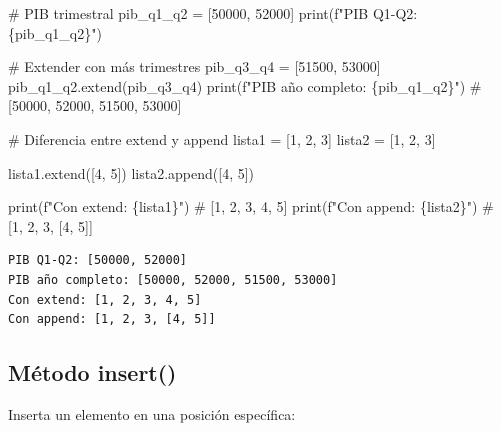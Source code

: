 \documentclass[
  doc,
  floatsintext,
  longtable,
  a4paper,
  nolmodern,
  notxfonts,
  notimes,
  12pt,
  colorlinks=true,linkcolor=blue,citecolor=blue,urlcolor=blue]{apa7}
\newenvironment{Shaded}{\begin{snugshade}}{\end{snugshade}}
\newcommand{\BuiltInTok}[1]{\textcolor[rgb]{0.00,0.23,0.31}{#1}}
\newcommand{\CommentTok}[1]{\textcolor[rgb]{0.37,0.37,0.37}{#1}}
\newcommand{\DecValTok}[1]{\textcolor[rgb]{0.68,0.00,0.00}{#1}}
\newcommand{\NormalTok}[1]{\textcolor[rgb]{0.00,0.23,0.31}{#1}}
\newcommand{\OperatorTok}[1]{\textcolor[rgb]{0.37,0.37,0.37}{#1}}
\newcommand{\SpecialCharTok}[1]{\textcolor[rgb]{0.37,0.37,0.37}{#1}}
\newcommand{\SpecialStringTok}[1]{\textcolor[rgb]{0.13,0.47,0.30}{#1}}
\begin{document}
\begin{Shaded}
\begin{Highlighting}[]
\CommentTok{\# PIB trimestral}
\NormalTok{pib\_q1\_q2 }\OperatorTok{=}\NormalTok{ [}\DecValTok{50000}\NormalTok{, }\DecValTok{52000}\NormalTok{]}
\BuiltInTok{print}\NormalTok{(}\SpecialStringTok{f"PIB Q1{-}Q2: }\SpecialCharTok{\{}\NormalTok{pib\_q1\_q2}\SpecialCharTok{\}}\SpecialStringTok{"}\NormalTok{)}

\CommentTok{\# Extender con más trimestres}
\NormalTok{pib\_q3\_q4 }\OperatorTok{=}\NormalTok{ [}\DecValTok{51500}\NormalTok{, }\DecValTok{53000}\NormalTok{]}
\NormalTok{pib\_q1\_q2.extend(pib\_q3\_q4)}
\BuiltInTok{print}\NormalTok{(}\SpecialStringTok{f"PIB año completo: }\SpecialCharTok{\{}\NormalTok{pib\_q1\_q2}\SpecialCharTok{\}}\SpecialStringTok{"}\NormalTok{)}
\CommentTok{\# [50000, 52000, 51500, 53000]}

\CommentTok{\# Diferencia entre extend y append}
\NormalTok{lista1 }\OperatorTok{=}\NormalTok{ [}\DecValTok{1}\NormalTok{, }\DecValTok{2}\NormalTok{, }\DecValTok{3}\NormalTok{]}
\NormalTok{lista2 }\OperatorTok{=}\NormalTok{ [}\DecValTok{1}\NormalTok{, }\DecValTok{2}\NormalTok{, }\DecValTok{3}\NormalTok{]}

\NormalTok{lista1.extend([}\DecValTok{4}\NormalTok{, }\DecValTok{5}\NormalTok{])}
\NormalTok{lista2.append([}\DecValTok{4}\NormalTok{, }\DecValTok{5}\NormalTok{])}

\BuiltInTok{print}\NormalTok{(}\SpecialStringTok{f"Con extend: }\SpecialCharTok{\{}\NormalTok{lista1}\SpecialCharTok{\}}\SpecialStringTok{"}\NormalTok{)  }\CommentTok{\# [1, 2, 3, 4, 5]}
\BuiltInTok{print}\NormalTok{(}\SpecialStringTok{f"Con append: }\SpecialCharTok{\{}\NormalTok{lista2}\SpecialCharTok{\}}\SpecialStringTok{"}\NormalTok{)  }\CommentTok{\# [1, 2, 3, [4, 5]]}
\end{Highlighting}
\end{Shaded}

\begin{verbatim}
PIB Q1-Q2: [50000, 52000]
PIB año completo: [50000, 52000, 51500, 53000]
Con extend: [1, 2, 3, 4, 5]
Con append: [1, 2, 3, [4, 5]]
\end{verbatim}

\subsection{Método insert()}\label{muxe9todo-insert}

Inserta un elemento en una posición específica:
\end{document}
